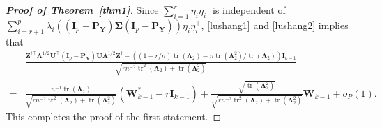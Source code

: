 \documentclass[12pt]{article} %
\DeclareMathOperator{\mytr}{tr}
\newcommand{\bZ}{\mathbf{Z}}
\newcommand{\bP}{\mathbf{P}}
\newcommand{\bY}{\mathbf{Y}}
\newcommand{\bI}{\mathbf{I}}
\newcommand{\bU}{\mathbf{U}}
\newcommand{\bW}{\mathbf{W}}
\newcommand{\bfsym}[1]{\ensuremath{\boldsymbol{#1}}}
\def\bLambda {\bfsym {\Lambda}}
\def\bSigma {\bfsym {\Sigma}}
\theoremstyle{definition}
\begin{document}
\begin{appendices}
\begin{proof}[\textbf{Proof of Theorem~\ref{thm1}}]
Since $\sum_{i=1}^r \eta_i \eta_i^\top$ is independent of $
\sum_{i=r+1}^p \lambda_i ( (\bI_p-\bP_{\bY})\bSigma (\bI_p-\bP_{\bY}))\eta_i \eta_i^\top
$, \eqref{lushang1} and \eqref{lushang2} implies that
\begin{equation}\label{lushang3}
    \begin{split}
&
\frac{
    \bZ^{\dagger \top} \bLambda^{1/2}\bU^\top (\bI_p-\bP_{\bY})\bU\bLambda^{1/2}\bZ^{\dagger}
    -
    \left((1+r/n)\mytr(\bLambda_2)-n\mytr(\bLambda_2^2)/\mytr(\bLambda_2)\right)\bI_{k-1}
}{
    \sqrt{
        rn^{-2}\mytr^2(\bLambda_2)+ 
        \mytr(\bLambda_2^2)
    }
}
\\
=&
\frac{
    n^{-1} \mytr(\bLambda_2)
}{
    \sqrt{
        rn^{-2} \mytr^2 (\bLambda_2) + \mytr(\bLambda_2^2)
    }
}
(\bW_{k-1}^* - r\bI_{k-1})
+
\frac{
    \sqrt{\mytr(\bLambda_2^2)}
}{
    \sqrt{
        rn^{-2} \mytr^2 (\bLambda_2) + \mytr(\bLambda_2^2)
    }
}
\bW_{k-1}
+o_P(1).
    \end{split}
\end{equation}
This completes the proof of the first statement.


\end{proof}
\end{appendices}
\end{document}

